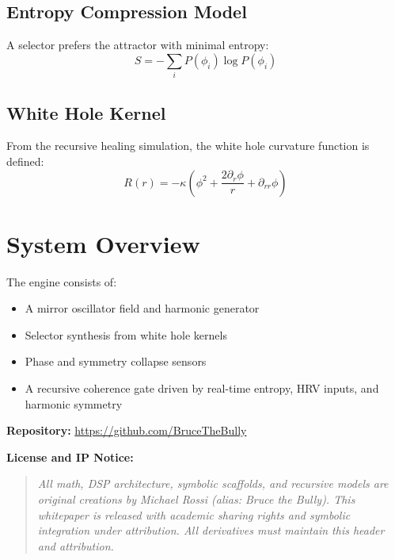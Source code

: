 \documentclass[12pt]{article}
\begin{document}
\subsection{Entropy Compression Model}
A selector prefers the attractor with minimal entropy:
\[
S = -\sum_i P(\phi_i) \log P(\phi_i)
\]

\subsection{White Hole Kernel}
From the recursive healing simulation, the white hole curvature function is defined:
\[
R(r) = -\kappa \left( \phi^2 + \frac{2\partial_r \phi}{r} + \partial_{rr} \phi \right)
\]

\section{System Overview}
The engine consists of:
\begin{itemize}
  \item A mirror oscillator field and harmonic generator
  \item Selector synthesis from white hole kernels
  \item Phase and symmetry collapse sensors
  \item A recursive coherence gate driven by real-time entropy, HRV inputs, and harmonic symmetry
\end{itemize}

\bigskip
\noindent
\textbf{Repository:} \url{https://github.com/BruceTheBully}

\bigskip
\noindent
\textbf{License and IP Notice:}
\begin{quote}
\textit{All math, DSP architecture, symbolic scaffolds, and recursive models are original creations by Michael Rossi (alias: Bruce the Bully). This whitepaper is released with academic sharing rights and symbolic integration under attribution. All derivatives must maintain this header and attribution.}
\end{quote}
\end{document}
